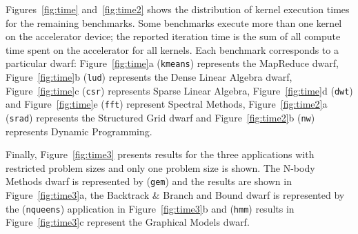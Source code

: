 \documentclass[../document.tex]{subfiles}
\begin{document}

Figures~\ref{fig:time} and~\ref{fig:time2} shows the distribution of kernel execution times for the remaining benchmarks.
Some benchmarks execute more than one kernel on the accelerator device; the reported iteration time is the sum of all compute time spent on the accelerator for all kernels.
Each benchmark corresponds to a particular dwarf: 
Figure~\ref{fig:time}a ({\tt kmeans}) represents the MapReduce dwarf,
Figure~\ref{fig:time}b ({\tt lud}) represents the Dense Linear Algebra dwarf,
Figure~\ref{fig:time}c ({\tt csr}) represents Sparse Linear Algebra, 
Figure~\ref{fig:time}d ({\tt dwt}) and Figure~\ref{fig:time}e ({\tt fft}) represent Spectral Methods,
Figure~\ref{fig:time2}a ({\tt srad}) represents the Structured Grid dwarf and Figure~\ref{fig:time2}b ({\tt nw}) represents Dynamic Programming.

Finally, Figure~\ref{fig:time3} presents results for the three applications with restricted problem sizes and only one problem size is shown.
The N-body Methods dwarf is represented by ({\tt gem}) and the results are shown in Figure~\ref{fig:time3}a, the Backtrack \& Branch and Bound dwarf is represented by the ({\tt nqueens}) application in Figure~\ref{fig:time3}b and ({\tt hmm}) results in Figure~\ref{fig:time3}c represent the Graphical Models dwarf.
\end{document}
